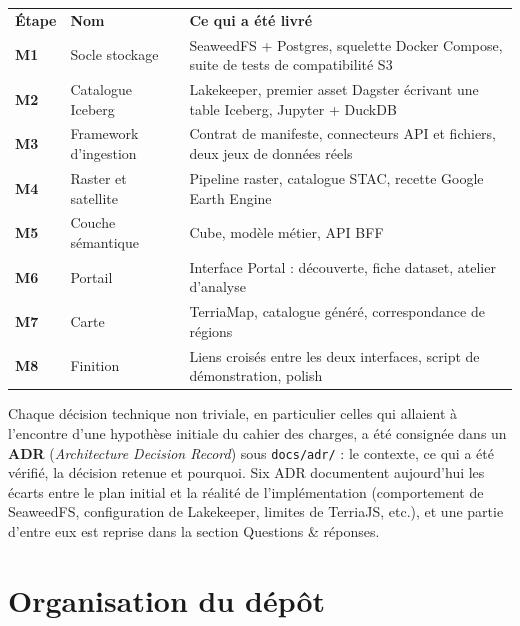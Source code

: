 \documentclass[11pt,a4paper]{article}
\newcommand{\tblhead}[1]{\headingfont\bfseries\footnotesize\color{white} #1}
\begin{document}
\begin{center}
\small
\begin{tabular}{@{} M{1.3cm} M{3.0cm} M{\dimexpr\textwidth-1.3cm-3.0cm-4\tabcolsep\relax} @{}}
\tblhead{Étape} & \tblhead{Nom} & \tblhead{Ce qui a été livré} \\
 \bfseries\color{teal} M1 & Socle stockage & SeaweedFS + Postgres, squelette Docker Compose, suite de tests de compatibilité S3 \\
\bfseries\color{teal} M2 & Catalogue Iceberg & Lakekeeper, premier asset Dagster écrivant une table Iceberg, Jupyter + DuckDB \\
 \bfseries\color{teal} M3 & Framework d'ingestion & Contrat de manifeste, connecteurs API et fichiers, deux jeux de données réels \\
\bfseries\color{teal} M4 & Raster et satellite & Pipeline raster, catalogue STAC, recette Google Earth Engine \\
 \bfseries\color{teal} M5 & Couche sémantique & Cube, modèle métier, API BFF \\
\bfseries\color{teal} M6 & Portail & Interface Portal : découverte, fiche dataset, atelier d'analyse \\
 \bfseries\color{teal} M7 & Carte & TerriaMap, catalogue généré, correspondance de régions \\
\bfseries\color{teal} M8 & Finition & Liens croisés entre les deux interfaces, script de démonstration, polish \\
\end{tabular}
\end{center}

Chaque décision technique non triviale, en particulier celles qui allaient à l'encontre d'une hypothèse initiale du cahier des charges, a été consignée dans un \textbf{ADR} (\emph{Architecture Decision Record}) sous \texttt{docs/adr/} : le contexte, ce qui a été vérifié, la décision retenue et pourquoi. Six ADR documentent aujourd'hui les écarts entre le plan initial et la réalité de l'implémentation (comportement de SeaweedFS, configuration de Lakekeeper, limites de TerriaJS, etc.), et une partie d'entre eux est reprise dans la section Questions \& réponses.

\section{Organisation du dépôt}
\end{document}
